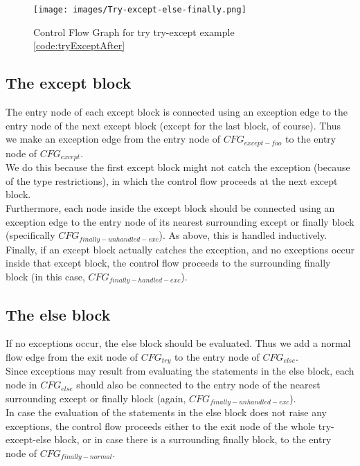 \begin{figure}
	\vspace{-20pt}
	\begin{center}
		\texttt{[image: images/Try-except-else-finally.png]}
	\end{center}
	\vspace{-10pt}
	\caption{Control Flow Graph for try try-except example \ref{code:tryExceptAfter}}
	\label{fig:tryExceptCfg}
	\vspace{-10pt}
\end{figure}
\subsection{The except block}
The entry node of each except block is connected using an exception edge to the entry node of the next except block (except for the last block, of course). Thus we make an exception edge from the entry node of $CFG_{except-foo}$ to the entry node of $CFG_{except}$. \\
We do this because the first except block might not catch the exception (because of the type restrictions), in which the control flow proceeds at the next except block. \\
Furthermore, each node inside the except block should be connected using an exception edge to the entry node of its nearest surrounding except or finally block (specifically $CFG_{finally-unhandled-exc}$). As above, this is handled inductively. \\
Finally, if an except block actually catches the exception, and no exceptions occur inside that except block, the control flow proceeds to the surrounding finally block (in this case, $CFG_{finally-handled-exc}$). 

\subsection{The else block}
If no exceptions occur, the else block should be evaluated. Thus we add a normal flow edge from the exit node of $CFG_{try}$ to the entry node of $CFG_{else}$.\\
Since exceptions may result from evaluating the statements in the else block, each node in $CFG_{else}$ should also be connected to the entry node of the nearest surrounding except or finally block (again, $CFG_{finally-unhandled-exc}$). \\
In case the evaluation of the statements in the else block does not raise any exceptions, the control flow proceeds either to the exit node of the whole try-except-else block, or in case there is a surrounding finally block, to the entry node of $CFG_{finally-normal}$.